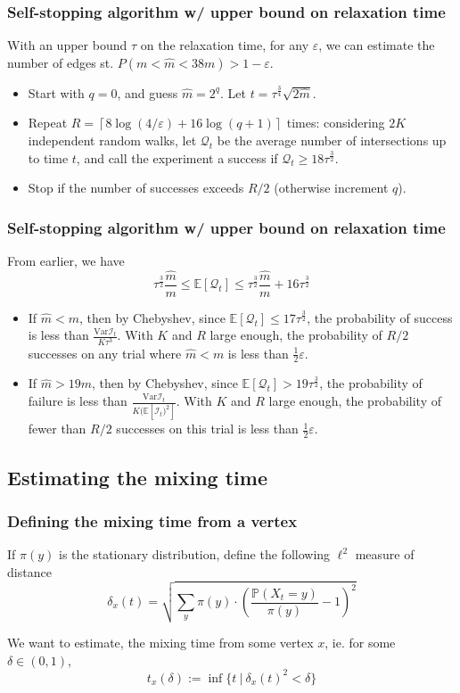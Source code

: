 \documentclass{beamer}
\newcommand{\Var}{\textrm{Var}}
\newcommand{\E}{\mathbb{E}}
\newcommand{\Prob}{\mathbb{P}}
\newcommand{\ceil}[1]{\left\lceil #1 \right\rceil}
\newcommand{\eps}{\varepsilon}
\begin{document}
\begin{frame}
\frametitle{Self-stopping algorithm w/ upper bound on relaxation time}

With an upper bound $\tau$ on the relaxation time, for any $\eps$, we can estimate the number of edges st. $P(m<\hat{m}<38m) > 1-\eps$.

\begin{itemize}
\item Start with $q=0$, and guess $\hat{m}=2^q$. Let $t = \tau^{\frac34}\sqrt{2\hat{m}}$. 

\item Repeat $R = \ceil{8\log (4/\eps)+16\log(q+1)}$ times: considering $2K$ independent random walks, let $\mathcal{Q}_t$ be the average number of intersections up to time $t$, and call the experiment a success if $\mathcal{Q}_t\geq 18\tau^{\frac32}$. 

\item Stop if the number of successes exceeds $R/2$ (otherwise increment $q$).

\end{itemize}

\end{frame}

\begin{frame}
\frametitle{Self-stopping algorithm w/ upper bound on relaxation time}

From earlier, we have
\[
\tau^{\frac32}\frac{\hat{m}}{m}\leq \E[\mathcal{Q}_t]\leq \tau^{\frac32}\frac{\hat{m}}{m}+16\tau^{\frac32}
\]

\begin{itemize}
    \item If $\hat{m}<m$, then by Chebyshev, since $\E[\mathcal{Q}_t]\leq 17\tau^{\frac32}$, the probability of success is less than $\frac{\Var \mathcal{I}_t}{K\tau^3}$. With $K$ and $R$ large enough, the probability of $R/2$ successes on any trial where $\hat{m}<m$ is less than $\frac12\eps$.
    \item If $\hat{m}>19m$, then by Chebyshev, since $\E[\mathcal{Q}_t]> 19\tau^{\frac32}$, the probability of failure is less than $\frac{\Var \mathcal{I}_t}{K(\E[\mathcal{I}_t)^2]}$. With $K$ and $R$ large enough, the probability of fewer than $R/2$ successes on this trial is less than $\frac12\eps$.
\end{itemize}

\end{frame}

\subsection{Estimating the mixing time}
\begin{frame}
\frametitle{Defining the mixing time from a vertex}

If $\pi(y)$ is the stationary distribution, define the following $\ell^2$ measure of distance
\[
\delta_x(t) = \sqrt{\sum_y \pi(y)\cdot (\frac{\Prob(X_t = y)}{\pi(y)}-1)^2}
\]

We want to estimate, the mixing time from some vertex $x$, ie. for some $\delta\in (0,1)$,
\[
t_x(\delta) := \inf \{t\ |\ \delta_x(t)^2<\delta \}
\]

\end{frame}
\end{document}
